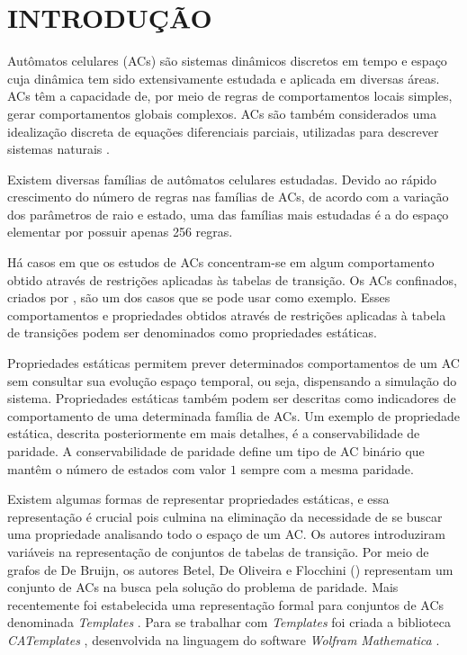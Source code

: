 \section{INTRODUÇÃO}
\label{sec:introducao}

Autômatos celulares (ACs) são sistemas dinâmicos discretos em tempo e espaço cuja dinâmica tem sido extensivamente estudada e aplicada em diversas áreas. %
ACs têm a capacidade de, por meio de regras de comportamentos locais simples, gerar comportamentos globais complexos. %
ACs são também considerados uma idealização discreta de equações diferenciais parciais, utilizadas para descrever sistemas naturais \cite{wolfram1994cellular}.

Existem diversas famílias de autômatos celulares estudadas. Devido ao rápido crescimento do número de regras nas famílias de ACs, de acordo com a variação dos parâmetros de raio e estado, uma das famílias mais estudadas é a do espaço elementar por possuir apenas 256 regras.

Há casos em que os estudos de ACs concentram-se em algum comportamento obtido através de restrições aplicadas às tabelas de transição. Os ACs confinados, criados por , são um dos casos que se pode usar como exemplo. Esses comportamentos e propriedades obtidos através de restrições aplicadas à tabela de transições podem ser denominados como propriedades estáticas.

Propriedades estáticas permitem prever determinados comportamentos de um AC sem consultar sua evolução espaço temporal, ou seja, dispensando a simulação do sistema. Propriedades estáticas também podem ser descritas como indicadores de comportamento de uma determinada família de ACs. Um exemplo de propriedade estática, descrita posteriormente em mais detalhes, é a conservabilidade de paridade. A conservabilidade de paridade define um tipo de AC binário que mantêm o número de estados com valor $1$ sempre com a mesma paridade.

Existem algumas formas de representar propriedades estáticas, e essa representação é crucial pois culmina na eliminação da necessidade de se buscar uma propriedade analisando todo o espaço de um AC. Os autores  introduziram variáveis na representação de conjuntos de tabelas de transição. Por meio de grafos de De Bruijn, os autores Betel, De Oliveira e Flocchini (\citeyear{Betel2013}) representam um conjunto de ACs na busca pela solução do problema de paridade. Mais recentemente foi estabelecida uma representação formal para conjuntos de ACs denominada \textit{Templates} \cite{deOliveira2014,deOliveira2014b}. Para se trabalhar com  \textit{Templates} foi criada a biblioteca \textit{CATemplates} \cite{CATemplates}, desenvolvida na linguagem do software \textit{Wolfram Mathematica} \cite{woframMathematica10}.

